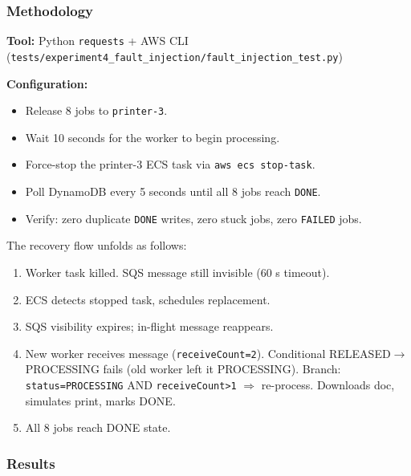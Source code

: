 \documentclass[11pt,letterpaper]{article}
\newcommand{\code}[1]{\texttt{\small #1}}
\begin{document}
\subsubsection{Methodology}
\textbf{Tool:} Python \code{requests} + AWS CLI (\code{tests/experiment4\_fault\_injection/fault\_injection\_test.py})

\textbf{Configuration:}
\begin{itemize}[noitemsep]
  \item Release 8 jobs to \code{printer-3}.
  \item Wait 10 seconds for the worker to begin processing.
  \item Force-stop the printer-3 ECS task via \code{aws ecs stop-task}.
  \item Poll DynamoDB every 5 seconds until all 8 jobs reach \texttt{DONE}.
  \item Verify: zero duplicate \texttt{DONE} writes, zero stuck jobs, zero \texttt{FAILED} jobs.
\end{itemize}

The recovery flow unfolds as follows:
\begin{enumerate}[noitemsep,label=\texttt{T+\arabic*.}]
  \item[$T_0$:] Worker task killed. SQS message still invisible (60 s timeout).
  \item[$T_{30}$:] ECS detects stopped task, schedules replacement.
  \item[$T_{60}$:] SQS visibility expires; in-flight message reappears.
  \item[$T_{60-80}$:] New worker receives message (\code{receiveCount=2}). Conditional RELEASED$\to$PROCESSING fails (old worker left it PROCESSING). Branch: \code{status=PROCESSING} AND \code{receiveCount>1} $\Rightarrow$ re-process. Downloads doc, simulates print, marks DONE.
  \item[$T_{140.5}$:] All 8 jobs reach DONE state.
\end{enumerate}

\subsubsection{Results}
\end{document}
